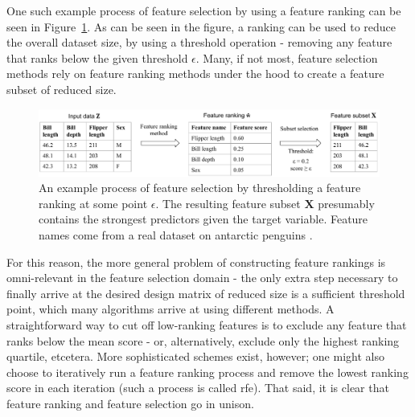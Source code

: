 \documentclass{article}
\begin{document}
One such example process of feature selection by using a feature ranking can be seen in Figure~\ref{fig:schematic-feature-selection}. As can be seen in the figure, a ranking can be used to reduce the overall dataset size, by using a threshold operation - removing any feature that ranks below the given threshold $\epsilon$. Many, if not most, feature selection methods rely on feature ranking methods under the hood to create a feature subset of reduced size.

\begin{figure}[h]
    \centering
    \includegraphics[width=\linewidth]{report/images/schematic-feature-selection.pdf}
    \caption{An example process of feature selection by thresholding a feature ranking at some point $\epsilon$. The resulting feature subset $\mathbf{X}$ presumably contains the strongest predictors given the target variable. Feature names come from a real dataset on antarctic penguins \citep{horst_palmerpenguins_2020}.}
    \label{fig:schematic-feature-selection}
\end{figure}

For this reason, the more general problem of constructing feature rankings is omni-relevant in the feature selection domain - the only extra step necessary to finally arrive at the desired design matrix of reduced size is a sufficient threshold point, which many algorithms arrive at using different methods. A straightforward way to cut off low-ranking features is to exclude any feature that ranks below the mean score - or, alternatively, exclude only the highest ranking quartile, etcetera. More sophisticated schemes exist, however; one might also choose to iteratively run a feature ranking process and remove the lowest ranking score in each iteration (such a process is called \gls{rfe}). That said, it is clear that feature ranking and feature selection go in unison.

\end{document}
